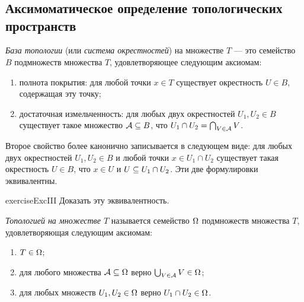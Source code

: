 \documentclass[main]{subfiles}
\begin{document}
\resetcounters

\section{}

\subsection{Аксимоматическое определение топологических пространств}

\begin{definition}
	\emph{База топологии} (или \emph{система окрестностей}) на множестве $ T $ --- это семейство $ B $ подмножеств
	множества $ T $, удовлетворяющее следующим аксиомам:
	\begin{enumerate}
		\item полнота покрытия: для любой точки $ x \in T $ существует окрестность $ U \in B $, содержащая эту точку;
		\item достаточная измельченность: для любых двух окрестностей $ U_1, U_2 \in B $ существует такое множество
			$\mathcal{A} \subseteq B $, что $ U_1 \cap U_2 = \bigcap_{V \in \mathcal{A}} V $.
	\end{enumerate}
\end{definition}

\begin{remark}
	Второе свойство более канонично записывается в следующем виде: для любых двух окрестностей $ U_1, U_2 \in B $ и
	любой точки $ x \in U_1 \cap U_2 $ существует такая окрестность $ U \in B $, что $ x \in U $ и
	$ U \subseteq U_1 \cap U_2 $. Эти две формулировки эквивалентны.
\end{remark}

\begin{restatable}{exercise}{ExcIII}
	Доказать эту эквивалентность.
\end{restatable}

\begin{definition}
	\emph{Топологией на множестве $ T $} называется семейство $ \Omega $ подмножеств множества $ T $,
	удовлетворяющая следующим аксиомам:
	\begin{enumerate}
		\item $ T \in \Omega $;
		\item для любого множества $ \mathcal{A} \subseteq \Omega $ верно $ \bigcup_{V \in \mathcal{A}} V \in \Omega $;
		\item для любых множеств $ U_1, U_2 \in \Omega $ верно $ U_1 \cap U_2 \in \Omega $.
	\end{enumerate}
\end{definition}
\end{document}
